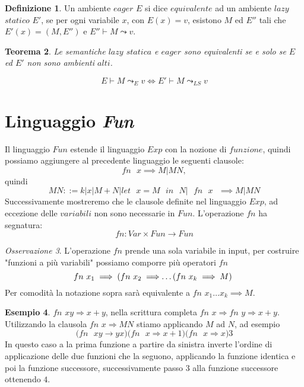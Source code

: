 \documentclass{article}
\newtheorem{theorem}{Teorema}[section]
\theoremstyle{definition}
\theoremstyle{definition}
\theoremstyle{definition}
\newtheorem{definition}[theorem]{Definizione}
\newtheorem{example}[theorem]{Esempio}
\theoremstyle{remark}
\newtheorem{remark}[theorem]{Osservazione}
\begin{document}
\begin{definition}
    Un ambiente $eager$ $E$ si dice $equivalente$ ad un ambiente $lazy$ $statico$ $E'$, se per ogni variabile $x$,  con $E(x)=v$, esistono $M$ ed $E''$ tali che $E'(x) = (M,E'')$ e $E''\vdash M \leadsto v$.
\end{definition}
\begin{theorem}Le semantiche $lazy$ $statica$ e $eager$ sono equivalenti se e solo se $E$ ed $E'$ non sono ambienti $alti$.

    $$E\vdash M \leadsto_E v \iff E' \vdash M \leadsto_{LS} v$$
\end{theorem}
\section{Linguaggio \textit{Fun}}
Il linguaggio $Fun$ estende il linguaggio $Exp$ con la nozione di $funzione$, quindi possiamo aggiungere al precedente linguaggio le seguenti clausole:
$$ \text{$fn$ $x$} \implies M|MN,$$
quindi
$$MN ::= k|x|M+N|\text{$let$ $x=M$ $in$ $N|$ $fn$ $x$ }\implies M|MN$$
Successivamente mostreremo che le clausole definite nel linguaggio $Exp$, ad eccezione delle $variabili$ non sono necessarie in $Fun$. L'operazione $fn$ ha segnatura:
$$fn: Var\times Fun \to Fun$$
\begin{remark}
    L'operazione $fn$ prende una sola variabile in input, per costruire "funzioni a più variabili" possiamo comporre più operatori $fn$
    $$\text{$fn$ $x_1 \implies (fn$ $x_2\implies$\dots($fn$ $x_k\implies M$) }$$
    Per comodità la notazione sopra sarà equivalente a $fn$ $x_1\dots x_k\implies M$.
\end{remark}
\begin{example}
    $fn$ $xy\Rightarrow x+y$, nella scrittura completa $fn$ $x\Rightarrow fn$ $y\Rightarrow x+y$.
    Utilizzando la clausola $fn$ $x\Rightarrow MN$ stiamo applicando $M$ ad $N$, ad esempio
    $$\text{$(fn$ $xy\rightarrow yx)$$(fn$ $x\Rightarrow x+1)$$(fn$ $x\Rightarrow x)3$}$$
    In questo caso a la prima funzione a partire da sinistra inverte l'ordine di applicazione delle due funzioni che la seguono,
    applicando la funzione identica e poi la funzione successore, successivamente passo $3$ alla funzione successore ottenendo $4$.
\end{example}
\end{document}

